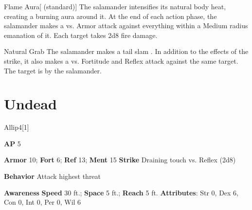 \begin{apability}{Flame Aura}[ (standard)]
The salamander intensifies its natural body heat, creating a burning aura around it.
At the end of each action phase, the salamander makes a  vs. Armor
attack against everything within a Medium radius emanation of it.
\hit Each target takes 2d8 fire damage.
\end{apability}

\vspace{0.5em}
\begin{freeability}{Natural Grab}
The salamander makes a tail slam .
In addition to the effects of the strike, it also makes a  vs. Fortitude and Reflex attack against the same target.
\hit The target is  by the salamander.
\end{freeability}

\section{Undead}
\begin{monsection}{Allip}{4}[1]
\vspace{-1em}\vspace{-1em}
\begin{spellcontent}
\begin{spelltargetinginfo}
{\textbf{AP} 5}

\pari \textbf{Armor} 10;
\textbf{Fort} 6;
\textbf{Ref} 13;
\textbf{Ment} 15
\pari \textbf{Strike} Draining touch  vs. Reflex (2d8)



\pari \textbf{Behavior} Attack highest threat
\end{spelltargetinginfo}
\end{spellcontent}

\begin{monsterfooter}
\pari \textbf{Awareness} 
\pari \textbf{Speed} 30 ft.;
\textbf{Space} 5 ft.;
\textbf{Reach} 5 ft.
\pari \textbf{Attributes}:
Str 0,
Dex 6,
Con 0,
Int 0,
Per 0,
Wil 6
\end{monsterfooter}
\end{monsection}

